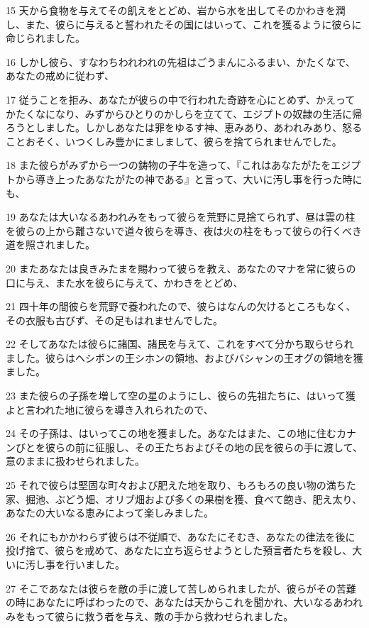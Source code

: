 \par 15 天から食物を与えてその飢えをとどめ、岩から水を出してそのかわきを潤し、また、彼らに与えると誓われたその国にはいって、これを獲るように彼らに命じられました。
\par 16 しかし彼ら、すなわちわれわれの先祖はごうまんにふるまい、かたくなで、あなたの戒めに従わず、
\par 17 従うことを拒み、あなたが彼らの中で行われた奇跡を心にとめず、かえってかたくなになり、みずからひとりのかしらを立てて、エジプトの奴隷の生活に帰ろうとしました。しかしあなたは罪をゆるす神、恵みあり、あわれみあり、怒ることおそく、いつくしみ豊かにましまして、彼らを捨てられませんでした。
\par 18 また彼らがみずから一つの鋳物の子牛を造って、『これはあなたがたをエジプトから導き上ったあなたがたの神である』と言って、大いに汚し事を行った時にも、
\par 19 あなたは大いなるあわれみをもって彼らを荒野に見捨てられず、昼は雲の柱を彼らの上から離さないで道々彼らを導き、夜は火の柱をもって彼らの行くべき道を照されました。
\par 20 またあなたは良きみたまを賜わって彼らを教え、あなたのマナを常に彼らの口に与え、また水を彼らに与えて、かわきをとどめ、
\par 21 四十年の間彼らを荒野で養われたので、彼らはなんの欠けるところもなく、その衣服も古びず、その足もはれませんでした。
\par 22 そしてあなたは彼らに諸国、諸民を与えて、これをすべて分かち取らせられました。彼らはヘシボンの王シホンの領地、およびバシャンの王オグの領地を獲ました。
\par 23 また彼らの子孫を増して空の星のようにし、彼らの先祖たちに、はいって獲よと言われた地に彼らを導き入れられたので、
\par 24 その子孫は、はいってこの地を獲ました。あなたはまた、この地に住むカナンびとを彼らの前に征服し、その王たちおよびその地の民を彼らの手に渡して、意のままに扱わせられました。
\par 25 それで彼らは堅固な町々および肥えた地を取り、もろもろの良い物の満ちた家、掘池、ぶどう畑、オリブ畑および多くの果樹を獲、食べて飽き、肥え太り、あなたの大いなる恵みによって楽しみました。
\par 26 それにもかかわらず彼らは不従順で、あなたにそむき、あなたの律法を後に投げ捨て、彼らを戒めて、あなたに立ち返らせようとした預言者たちを殺し、大いに汚し事を行いました。
\par 27 そこであなたは彼らを敵の手に渡して苦しめられましたが、彼らがその苦難の時にあなたに呼ばわったので、あなたは天からこれを聞かれ、大いなるあわれみをもって彼らに救う者を与え、敵の手から救わせられました。

